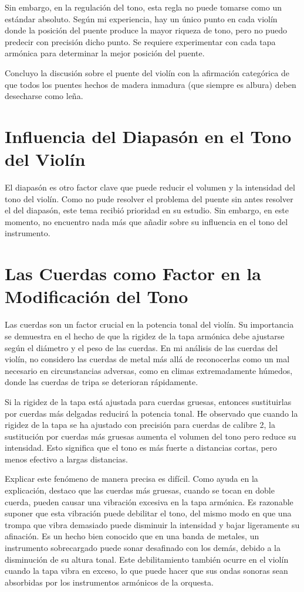 \documentclass[12pt]{book}
\begin{document}
Sin embargo, en la regulación del tono, esta regla no puede tomarse como un estándar absoluto. Según mi experiencia, hay un único punto en cada violín donde la posición del puente produce la mayor riqueza de tono, pero no puedo predecir con precisión dicho punto. Se requiere experimentar con cada tapa armónica para determinar la mejor posición del puente.

Concluyo la discusión sobre el puente del violín con la afirmación categórica de que todos los puentes hechos de madera inmadura (que siempre es albura) deben desecharse como leña.

\section*{Influencia del Diapasón en el Tono del Violín}

El diapasón es otro factor clave que puede reducir el volumen y la intensidad del tono del violín. Como no pude resolver el problema del puente sin antes resolver el del diapasón, este tema recibió prioridad en su estudio. Sin embargo, en este momento, no encuentro nada más que añadir sobre su influencia en el tono del instrumento.

\section*{Las Cuerdas como Factor en la Modificación del Tono}

Las cuerdas son un factor crucial en la potencia tonal del violín. Su importancia se demuestra en el hecho de que la rigidez de la tapa armónica debe ajustarse según el diámetro y el peso de las cuerdas. En mi análisis de las cuerdas del violín, no considero las cuerdas de metal más allá de reconocerlas como un mal necesario en circunstancias adversas, como en climas extremadamente húmedos, donde las cuerdas de tripa se deterioran rápidamente.

Si la rigidez de la tapa está ajustada para cuerdas gruesas, entonces sustituirlas por cuerdas más delgadas reducirá la potencia tonal. He observado que cuando la rigidez de la tapa se ha ajustado con precisión para cuerdas de calibre 2, la sustitución por cuerdas más gruesas aumenta el volumen del tono pero reduce su intensidad. Esto significa que el tono es más fuerte a distancias cortas, pero menos efectivo a largas distancias.

Explicar este fenómeno de manera precisa es difícil. Como ayuda en la explicación, destaco que las cuerdas más gruesas, cuando se tocan en doble cuerda, pueden causar una vibración excesiva en la tapa armónica. Es razonable suponer que esta vibración puede debilitar el tono, del mismo modo en que una trompa que vibra demasiado puede disminuir la intensidad y bajar ligeramente su afinación. Es un hecho bien conocido que en una banda de metales, un instrumento sobrecargado puede sonar desafinado con los demás, debido a la disminución de su altura tonal. Este debilitamiento también ocurre en el violín cuando la tapa vibra en exceso, lo que puede hacer que sus ondas sonoras sean absorbidas por los instrumentos armónicos de la orquesta.
\end{document}

